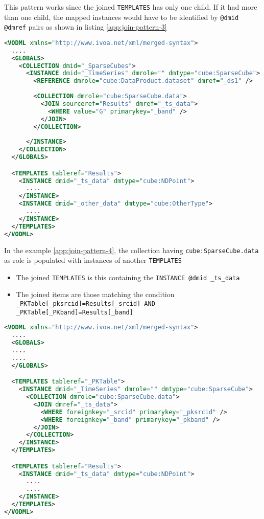 This pattern works since the joined \texttt{TEMPLATES} has only one child. 
If it had more than one child, the mapped instances would have to be identified by \texttt{@dmid} \texttt{@dmref} pairs as shown in listing \ref{app:join-pattern-3}

\begin{lstlisting}[label={app:join-pattern-3},caption={Joining a \texttt{TEMPLATES} with a global \texttt{COLLECTION} identified by both \texttt{@sourceref} and \texttt{@dmid} \texttt{@dmref} pairs},language=XML]
<VODML xmlns="http://www.ivoa.net/xml/merged-syntax">
  ....
  <GLOBALS>
    <COLLECTION dmid="_SparseCubes">
      <INSTANCE dmid="_TimeSeries" dmrole="" dmtype="cube:SparseCube">
        <REFERENCE dmrole="cube:DataProduct.dataset" dmref="_ds1" />
        
        <COLLECTION dmrole="cube:SparseCube.data">
          <JOIN sourceref="Results" dmref="_ts_data">
            <WHERE value="G" primarykey="_band" />
          </JOIN>
        </COLLECTION>
        
      </INSTANCE>
    </COLLECTION>
  </GLOBALS>

  <TEMPLATES tableref="Results">
    <INSTANCE dmid="_ts_data" dmtype="cube:NDPoint">
      ....
    </INSTANCE>
    <INSTANCE dmid="_other_data" dmtype="cube:OtherType">
      ....
    </INSTANCE>
  </TEMPLATES>
</VODML>
\end{lstlisting}  

In the example \ref{app:join-pattern-4}, the collection having \texttt{cube:SparseCube.data} as role is populated with  instances of another \texttt{TEMPLATES}
\begin{itemize}
  \item The joined \texttt{TEMPLATES} is this containing the  \texttt{INSTANCE \texttt{@dmid} \_ts\_data}
  \item The joined items are those matching the condition  \texttt{\_PKTable[\_pksrcid]=Results[\_srcid] AND  \_PKTable[\_PKband]=Results[\_band]}
\end{itemize}


\begin{lstlisting}[label={app:join-pattern-4},caption={Joining two \texttt{TEMPLATES} together with \texttt{@dmid} \texttt{@dmref} pairs},language=XML]
<VODML xmlns="http://www.ivoa.net/xml/merged-syntax">
  ....
  <GLOBALS>
  ....
  ....
  </GLOBALS>

  <TEMPLATES tableref="_PKTable">
    <INSTANCE dmid="_TimeSeries" dmrole="" dmtype="cube:SparseCube">
      <COLLECTION dmrole="cube:SparseCube.data">
        <JOIN dmref="_ts_data">
          <WHERE foreignkey="_srcid" primarykey="_pksrcid" />
          <WHERE foreignkey="_band" primarykey="_pkband" />
        </JOIN>
      </COLLECTION>
    </INSTANCE>
  </TEMPLATES>

  <TEMPLATES tableref="Results">
    <INSTANCE dmid="_ts_data" dmtype="cube:NDPoint">
      ....
      ....
    </INSTANCE>
  </TEMPLATES>
</VODML>
\end{lstlisting}  

